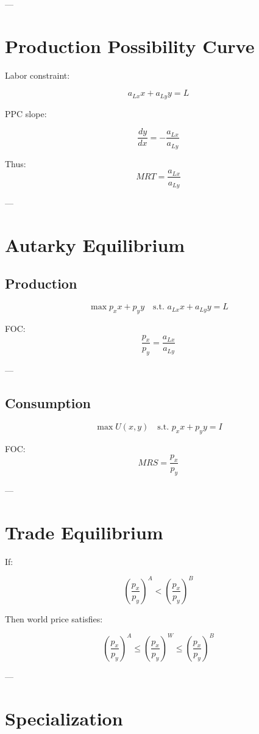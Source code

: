 ---

\section{Production Possibility Curve}

Labor constraint:

\[
a_{Lx} x + a_{Ly} y = L
\]

PPC slope:

\[
\frac{dy}{dx} = -\frac{a_{Lx}}{a_{Ly}}
\]

Thus:
\[
MRT = \frac{a_{Lx}}{a_{Ly}}
\]

---

\section{Autarky Equilibrium}

\subsection{Production}

\[
\max p_x x + p_y y
\quad \text{s.t. } a_{Lx} x + a_{Ly} y = L
\]

FOC:
\[
\frac{p_x}{p_y} = \frac{a_{Lx}}{a_{Ly}}
\]

---

\subsection{Consumption}

\[
\max U(x,y)
\quad \text{s.t. } p_x x + p_y y = I
\]

FOC:
\[
MRS = \frac{p_x}{p_y}
\]

---

\section{Trade Equilibrium}

If:

\[
\left(\frac{p_x}{p_y}\right)^A < \left(\frac{p_x}{p_y}\right)^B
\]

Then world price satisfies:

\[
\left(\frac{p_x}{p_y}\right)^A \leq \left(\frac{p_x}{p_y}\right)^W \leq \left(\frac{p_x}{p_y}\right)^B
\]

---

\section{Specialization}

